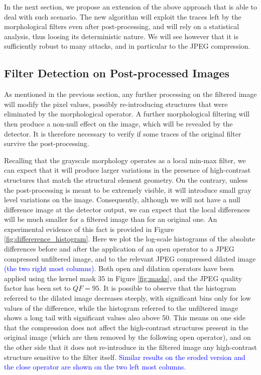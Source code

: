\documentclass{ieeeaccess}
\newcommand{\revisedtext}[1]{\textcolor{blue}{#1}}
\begin{document}
In the next section, we propose an extension of the above approach that is able to deal with such scenario. The new algorithm will exploit the traces left by the morphological filters even after post-processing, and will rely on a statistical analysis, thus loosing its deterministic nature. We will see however that it is sufficiently robust to many attacks, and in particular to the JPEG compression.

\subsection{Filter Detection on Post-processed Images}
As mentioned in the previous section, any further processing on the filtered image will modify the pixel values, possibly re-introducing structures that were eliminated by the morphological operator. A further morphological filtering will then produce a non-null effect on the image, which will be revealed by the detector. It is therefore necessary to verify if some traces of the original filter survive the post-processing.

Recalling that the grayscale morphology operates as a local min-max filter, we can expect that it will produce larger variations in the presence of high-contrast structures that match the structural element geometry. On the contrary, unless the post-processing is meant to be extremely visible, it will introduce small gray level variations on the image. Consequently, although we will not have a null difference image at the detector output, we can expect that the local differences will be much smaller for a filtered image than for an original one. An experimental evidence of this fact is provided in Figure \ref{fig:differerence_histogram}. Here we plot the log-scale histograms of the absolute differences before and after the application of an open operator to a JPEG compressed unfiltered image, and to the relevant JPEG compressed dilated image \revisedtext{(the two right most columns)}. Both open and dilation operators have been applied using the kernel mask $35$ in Figure \ref{fig:masks}, and the JPEG quality factor has been set to $QF=95$. It is possible to observe that the histogram referred to the dilated image decreases steeply, with significant bins only for low values of the difference, while the histogram referred to the unfiltered image shows a long tail with significant values also above 50. This means on one side that the compression does not affect the high-contrast structures present in the original image (which are then removed by the following open operator), and on the other side that it does not re-introduce in the filtered image any high-contrast structure sensitive to the filter itself. \revisedtext{Similar results on the eroded version and the close operator are shown on the two left most columns.}
\end{document}
